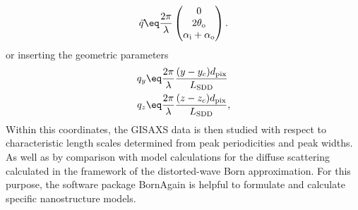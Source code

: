 \documentclass[\main/dresen_thesis.tex]{subfiles}
\begin{document}
    \begin{align}
      \vec{q} \eq \frac{2 \pi}{\lambda} \begin{pmatrix}
        0\\
        2 \theta_\mathrm{o}\\
        \alpha_\mathrm{i} + \alpha_\mathrm{o}
      \end{pmatrix}.
    \end{align}
    or inserting the geometric parameters
    \begin{align}
      \begin{split}
        q_y &\eq \frac{2 \pi}{\lambda} \frac{(y - y_c) d_\mathrm{pix}}{L_\mathrm{SDD}}\\
        q_z &\eq \frac{2 \pi}{\lambda} \frac{(z - z_c) d_\mathrm{pix}}{L_\mathrm{SDD}},
      \end{split}
    \end{align}
    Within this coordinates, the GISAXS data is then studied with respect to characteristic length scales determined from peak periodicities and peak widths.
    As well as by comparison with model calculations for the diffuse scattering calculated in the framework of the distorted-wave Born approximation.
    For this purpose, the software package BornAgain \cite{Burle_2018_borna} is helpful to formulate and calculate specific nanostructure models.
\end{document}
